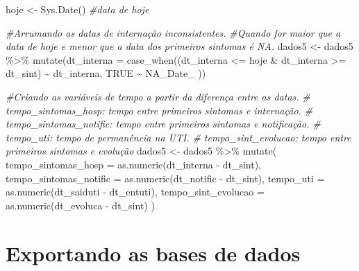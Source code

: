 \documentclass[
]{article}
\newenvironment{Shaded}{\begin{snugshade}}{\end{snugshade}}
\newcommand{\AttributeTok}[1]{\textcolor[rgb]{0.77,0.63,0.00}{#1}}
\newcommand{\CommentTok}[1]{\textcolor[rgb]{0.56,0.35,0.01}{\textit{#1}}}
\newcommand{\ConstantTok}[1]{\textcolor[rgb]{0.00,0.00,0.00}{#1}}
\newcommand{\FunctionTok}[1]{\textcolor[rgb]{0.00,0.00,0.00}{#1}}
\newcommand{\NormalTok}[1]{#1}
\newcommand{\OtherTok}[1]{\textcolor[rgb]{0.56,0.35,0.01}{#1}}
\newcommand{\SpecialCharTok}[1]{\textcolor[rgb]{0.00,0.00,0.00}{#1}}
\begin{document}
\begin{Shaded}
\begin{Highlighting}[]
\NormalTok{hoje }\OtherTok{\textless{}{-}} \FunctionTok{Sys.Date}\NormalTok{() }\CommentTok{\#data de hoje}

\CommentTok{\#Arrumando as datas de internação inconsistentes. }
\CommentTok{\#Quando for maior que a data de hoje e menor que a data dos primeiros sintomas é NA.}
\NormalTok{dados5 }\OtherTok{\textless{}{-}}\NormalTok{  dados5 }\SpecialCharTok{\%\textgreater{}\%}
  \FunctionTok{mutate}\NormalTok{(}\AttributeTok{dt\_interna =} \FunctionTok{case\_when}\NormalTok{((dt\_interna }\SpecialCharTok{\textless{}=}\NormalTok{ hoje }\SpecialCharTok{\&}
\NormalTok{                                   dt\_interna }\SpecialCharTok{\textgreater{}=}\NormalTok{ dt\_sint) }\SpecialCharTok{\textasciitilde{}}\NormalTok{ dt\_interna,}
                                \ConstantTok{TRUE} \SpecialCharTok{\textasciitilde{}}\NormalTok{ NA\_Date\_}
\NormalTok{  ))}
\end{Highlighting}
\end{Shaded}

\begin{Shaded}
\begin{Highlighting}[]
\CommentTok{\#Criando as variáveis de tempo a partir da diferença entre as datas. }
\CommentTok{\# tempo\_sintomas\_hosp: tempo entre primeiros sintomas e internação.}
\CommentTok{\# tempo\_sintomas\_notific: tempo entre primeiros sintomas e notificação.}
\CommentTok{\# tempo\_uti: tempo de permanência na UTI.}
\CommentTok{\# tempo\_sint\_evolucao: tempo entre primeiros sintomas e evolução}
\NormalTok{dados5 }\OtherTok{\textless{}{-}}\NormalTok{ dados5 }\SpecialCharTok{\%\textgreater{}\%} 
  \FunctionTok{mutate}\NormalTok{(}
    \AttributeTok{tempo\_sintomas\_hosp =} \FunctionTok{as.numeric}\NormalTok{(dt\_interna }\SpecialCharTok{{-}}\NormalTok{ dt\_sint),}
    \AttributeTok{tempo\_sintomas\_notific =} \FunctionTok{as.numeric}\NormalTok{(dt\_notific }\SpecialCharTok{{-}}\NormalTok{ dt\_sint),}
    \AttributeTok{tempo\_uti =} \FunctionTok{as.numeric}\NormalTok{(dt\_saiduti }\SpecialCharTok{{-}}\NormalTok{ dt\_entuti),}
    \AttributeTok{tempo\_sint\_evolucao =} \FunctionTok{as.numeric}\NormalTok{(dt\_evoluca }\SpecialCharTok{{-}}\NormalTok{ dt\_sint)}
\NormalTok{  )  }
\end{Highlighting}
\end{Shaded}

\hypertarget{exportando-as-bases-de-dados}{%
\section{Exportando as bases de
dados}\label{exportando-as-bases-de-dados}}
\end{document}
